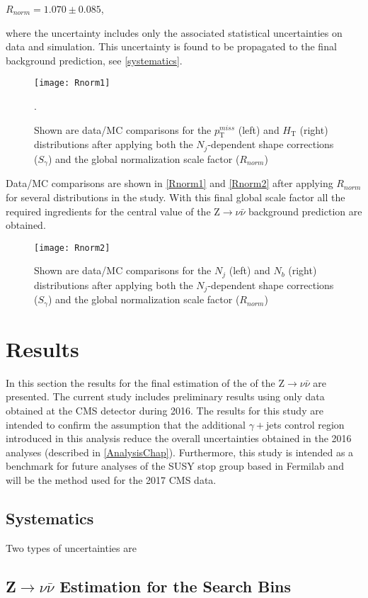 \begingroup
	\begin{center}
		$R_{norm} = 1.070 \pm 0.085$,
	\end{center}
\endgroup

\noindent where the uncertainty includes only the associated statistical uncertainties on data and simulation. This uncertainty is found to be propagated to the final background prediction, see \autoref{systematics}.\\

\begin{figure}[H]
\begin{center}
\texttt{[image: Rnorm1]}
\end{center}
\vspace{-1em}
\caption{Shown are data/MC comparisons for the $p_\text{T}^{miss}$ (left) and $H_\text{T}$ (right) distributions after applying both the $N_j$-dependent shape corrections ($S_\gamma$) and the global normalization scale factor ($R_{norm}$)}.
\label{Rnorm1}
\end{figure}

Data/MC comparisons are shown in \autoref{Rnorm1} and \autoref{Rnorm2} after applying $R_{norm}$ for several distributions in the study. With this final global scale factor all the required ingredients for the central value of the Z$\rightarrow\nu\bar{\nu}$ background prediction are obtained. 

\begin{figure}[H]
\begin{center}
\texttt{[image: Rnorm2]}
\end{center}
\vspace{-1em}
\caption{Shown are data/MC comparisons for the $N_j$ (left) and $N_b$ (right) distributions after applying both the $N_j$-dependent shape corrections ($S_\gamma$) and the global normalization scale factor ($R_{norm}$)}
\label{Rnorm2}
\end{figure}

\section{Results}

In this section the results for the final estimation of the of the Z$\rightarrow\nu\bar{\nu}$ are presented. The current study includes preliminary results using only data obtained at the CMS detector during 2016. The results for this study are intended to confirm the assumption that the additional $\gamma+$jets control region introduced in this analysis reduce the overall uncertainties obtained in the 2016 analyses (described in \autoref{AnalysisChap}). Furthermore, this study is intended as a benchmark for future analyses of the SUSY stop group based in Fermilab and will be the method used for the 2017 CMS data.

\subsection{Systematics}\label{systematics}

Two types of uncertainties are 

\subsection{Z$\rightarrow\nu\bar{\nu}$ Estimation for the Search Bins}

